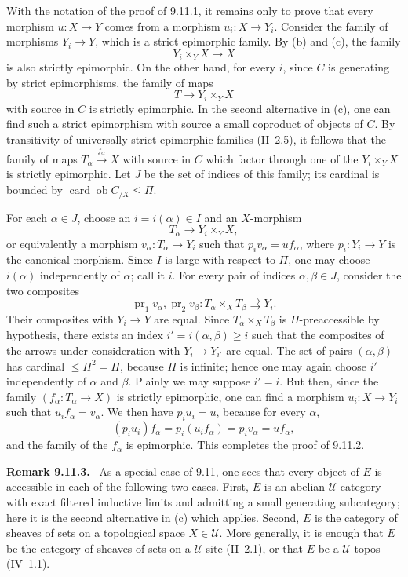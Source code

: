 \documentclass[11pt]{article}
\newcommand{\U}{\mathcal{U}}
\newcommand{\ob}{\operatorname{ob}}
\newcommand{\card}{\operatorname{card}}
\newenvironment{remarktext}[1]{\par\medskip\noindent\textbf{#1.}\ }{\par\medskip}
\begin{document}
With the notation of the proof of 9.11.1, it remains only to prove that every morphism $u:X\to Y$ comes from a morphism $u_i:X\to Y_i$. Consider the family of morphisms $Y_i\to Y$, which is a strict epimorphic family. By (b) and (c), the family
\[
 Y_i\times_Y X\longrightarrow X
\]
is also strictly epimorphic. On the other hand, for every $i$, since $C$ is generating by strict epimorphisms, the family of maps
\[
 T\longrightarrow Y_i\times_Y X
\]
with source in $C$ is strictly epimorphic. In the second alternative in (c), one can find such a strict epimorphism with source a small coproduct of objects of $C$. By transitivity of universally strict epimorphic families (II~2.5), it follows that the family of maps $T_\alpha\xrightarrow{f_\alpha}X$ with source in $C$ which factor through one of the $Y_i\times_Y X$ is strictly epimorphic. Let $J$ be the set of indices of this family; its cardinal is bounded by $\card\ob C_{/X}\leq\Pi$.

For each $\alpha\in J$, choose an $i=i(\alpha)\in I$ and an $X$-morphism
\[
 T_\alpha\longrightarrow Y_i\times_Y X,
\]
or equivalently a morphism $v_\alpha:T_\alpha\to Y_i$ such that $p_i v_\alpha=uf_\alpha$, where $p_i:Y_i\to Y$ is the canonical morphism. Since $I$ is large with respect to $\Pi$, one may choose $i(\alpha)$ independently of $\alpha$; call it $i$. For every pair of indices $\alpha,\beta\in J$, consider the two composites
\[
 \operatorname{pr}_1v_\alpha,
 \operatorname{pr}_2v_\beta:
 T_\alpha\times_XT_\beta\rightrightarrows Y_i .
\]
Their composites with $Y_i\to Y$ are equal. Since $T_\alpha\times_XT_\beta$ is $\Pi$-preaccessible by hypothesis, there exists an index $i'=i(\alpha,\beta)\geq i$ such that the composites of the arrows under consideration with $Y_i\to Y_{i'}$ are equal. The set of pairs $(\alpha,\beta)$ has cardinal $\leq\Pi^2=\Pi$, because $\Pi$ is infinite; hence one may again choose $i'$ independently of $\alpha$ and $\beta$. Plainly we may suppose $i'=i$. But then, since the family $(f_\alpha:T_\alpha\to X)$ is strictly epimorphic, one can find a morphism $u_i:X\to Y_i$ such that $u_if_\alpha=v_\alpha$. We then have $p_iu_i=u$, because for every $\alpha$,
\[
 (p_iu_i)f_\alpha=p_i(u_if_\alpha)=p_iv_\alpha=uf_\alpha,
\]
and the family of the $f_\alpha$ is epimorphic. This completes the proof of 9.11.2.

\begin{remarktext}{Remark 9.11.3}
As a special case of 9.11, one sees that every object of $E$ is accessible in each of the following two cases. First, $E$ is an abelian $\U$-category with exact filtered inductive limits and admitting a small generating subcategory; here it is the second alternative in (c) which applies. Second, $E$ is the category of sheaves of sets on a topological space $X\in\U$. More generally, it is enough that $E$ be the category of sheaves of sets on a $\U$-site (II~2.1), or that $E$ be a $\U$-topos (IV~1.1).
\end{remarktext}
\end{document}
